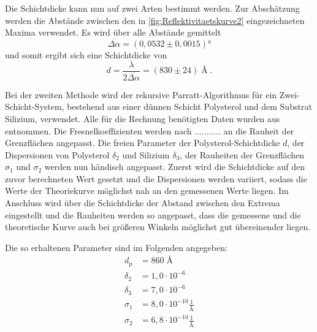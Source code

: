    Die Schichtdicke kann nun auf zwei Arten bestimmt werden.
    Zur Abschätzung werden die Abstände zwischen den in \autoref{fig:Reflektivitaetskurve2} eingezeichneten Maxima verwendet.
    Es wird über alle Abstände gemittelt
    \begin{equation*}
        \overline{\varDelta \alpha} = (0,0532 \pm 0,0015)°
    \end{equation*}
    und somit ergibt sich eine Schichtdicke von
    \begin{equation*}
        d = \frac{\lambda}{2 \overline{\Delta \alpha}} = (830 \pm 24) \; \text{\AA} \;.
    \end{equation*}

    Bei der zweiten Methode wird der rekursive Parratt-Algorithmus für ein Zwei-Schicht-System, bestehend aus einer dünnen Schicht Polysterol und dem Substrat Silizium, verwendet. Alle für die Rechnung benötigten Daten wurden aus \cite{tu_dortmund_versuchsanleitung_2021_e1} entnommen.
    Die Fresnelkoeffizienten werden nach ........... an die Rauheit der Grenzflächen angepasst.
    Die freien Parameter der Polysterol-Schichtdicke $d$, der Dispersionen von Polysterol $\delta_2$ und Silizium $\delta_3$, der Rauheiten der Grenzflächen $\sigma_1$ und $\sigma_2$ werden nun händisch angepasst.
    Zuerst wird die Schichtdicke auf den zuvor berechneten Wert gesetzt und die Dispersionen werden variiert, sodass die Werte der Theoriekurve möglichst nah an den gemessenen Werte liegen.
    Im Anschluss wird über die Schichtdicke der Abstand zwischen den Extrema eingestellt und die Rauheiten werden so angepasst, dass die gemessene und die theoretische Kurve auch bei größeren Winkeln möglichst gut übereinender liegen.

    Die so erhaltenen Parameter sind im Folgenden angegeben:
    \begin{align*}
        d_{\mathrm{p}} &= 860 \; \text{\AA} \\
        \delta_2 &= 1,0 \cdot 10^{-6} \\
        \delta_3 &= 7,0 \cdot 10^{-6} \\
        \sigma_1 &= 8,0 \cdot 10^{-10} \frac{1}{\text{\AA}}\\
        \sigma_2 &= 6,8 \cdot 10^{-10} \frac{1}{\text{\AA}}\\
    \end{align*}
    
